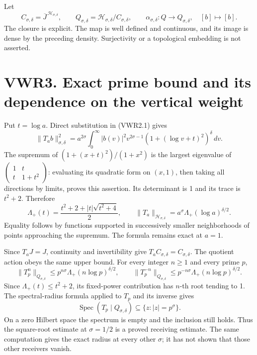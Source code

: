 Let \[
C_{\sigma,\delta}=\overline J^{\,\mathcal H_{\sigma,\delta}},\qquad
Q_{\sigma,\delta}=\mathcal H_{\sigma,\delta}/C_{\sigma,\delta},\qquad
\alpha_{\sigma,\delta}:Q\longrightarrow Q_{\sigma,\delta},\quad[b]\longmapsto[b].
\tag{VWR2.3}
\] The closure is explicit. The map is well defined and continuous, and
its image is dense by the preceding density. Surjectivity or a
topological embedding is not asserted.

\section{VWR3. Exact prime bound and its dependence on the vertical
weight}\label{vwr3.-exact-prime-bound-and-its-dependence-on-the-vertical-weight}

Put \(t=\log a\). Direct substitution in (VWR2.1) gives \[
\|T_ab\|_{\sigma,\delta}^2
=a^{2\sigma}\int_0^\infty |b(v)|^2v^{2\sigma-1}
 (1+(\log v+t)^2)^\delta\,dv.
\tag{VWR3.1}
\] The supremum of \((1+(x+t)^2)/(1+x^2)\) is the largest eigenvalue of
\(\begin{pmatrix}1&t\\t&1+t^2\end{pmatrix}\): evaluating its quadratic
form on \((x,1)\), then taking all directions by limits, proves this
assertion. Its determinant is 1 and its trace is \(t^2+2\). Therefore \[
\Lambda_+(t)=\frac{t^2+2+|t|\sqrt{t^2+4}}2,
\qquad
\|T_a\|_{\mathcal H_{\sigma,\delta}}=a^\sigma\Lambda_+(\log a)^{\delta/2}.
\tag{VWR3.2}
\] Equality follows by functions supported in successively smaller
neighborhoods of points approaching the supremum. The formula remains
exact at \(a=1\).

Since \(T_aJ=J\), continuity and invertibility give
\(T_aC_{\sigma,\delta}=C_{\sigma,\delta}\). The quotient action obeys
the same upper bound. For every integer \(n\ge1\) and every prime \(p\),
\[
\|T_p^n\|_{Q_{\sigma,\delta}}
\le p^{n\sigma}\Lambda_+(n\log p)^{\delta/2},\qquad
\|T_p^{-n}\|_{Q_{\sigma,\delta}}
\le p^{-n\sigma}\Lambda_+(n\log p)^{\delta/2}.
\tag{VWR3.3}
\] Since \(\Lambda_+(t)\le t^2+2\), its fixed-power contribution has
\(n\)-th root tending to 1. The spectral-radius formula applied to
\(T_p\) and its inverse gives \[
\operatorname{Spec}(T_p\mid Q_{\sigma,\delta})\subseteq\{z:|z|=p^\sigma\}.
\tag{VWR3.4}
\] On a zero Hilbert space the spectrum is empty and the inclusion still
holds. Thus the square-root estimate at \(\sigma=1/2\) is a proved
receiving estimate. The same computation gives the exact radius at every
other \(\sigma\); it has not shown that those other receivers vanish.

